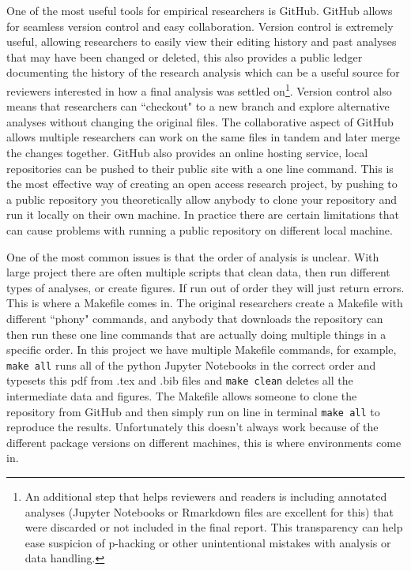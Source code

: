 \documentclass[12pt]{article}
\newcommand{\inlinecode}{\texttt}
\begin{document}
One of the most useful tools for empirical researchers is GitHub. GitHub allows for seamless version control and easy collaboration. Version control is extremely useful, allowing researchers to easily view their editing history and past analyses that may have been changed or deleted, this also provides a public ledger documenting the history of the research analysis which can be a useful source for reviewers interested in how a final analysis was settled on\footnote{An additional step that helps reviewers and readers is including annotated analyses (Jupyter Notebooks or Rmarkdown files are excellent for this) that were discarded or not included in the final report. This transparency can help ease suspicion of p-hacking or other unintentional mistakes with analysis or data handling.}. Version control also means that researchers can ``checkout" to a new branch and explore alternative analyses without changing the original files. The collaborative aspect of GitHub allows multiple researchers can work on the same files in tandem and later merge the changes together. GitHub also provides an online hosting service, local repositories can be pushed to their public site with a one line command. This is the most effective way of creating an open access research project, by pushing to a public repository you theoretically allow anybody to clone your repository and run it locally on their own machine. In practice there are certain limitations that can cause problems with running a public repository on different local machine.

One of the most common issues is that the order of analysis is unclear. With large project there are often multiple scripts that clean data, then run different types of analyses, or create figures. If run out of order they will just return errors. This is where a Makefile comes in. The original researchers create a Makefile with different ``phony" commands, and anybody that downloads the repository can then run these one line commands that are actually doing multiple things in a specific order. In this project we have multiple Makefile commands, for example, \inlinecode{make all} runs all of the python Jupyter Notebooks in the correct order and typesets this pdf from .tex and .bib files and \inlinecode{make clean} deletes all the intermediate data and figures. The Makefile allows someone to clone the repository from GitHub and then simply run on line in terminal \inlinecode{make all} to reproduce the results. Unfortunately this doesn't always work because of the different package versions on different machines, this is where environments come in.
\end{document}
